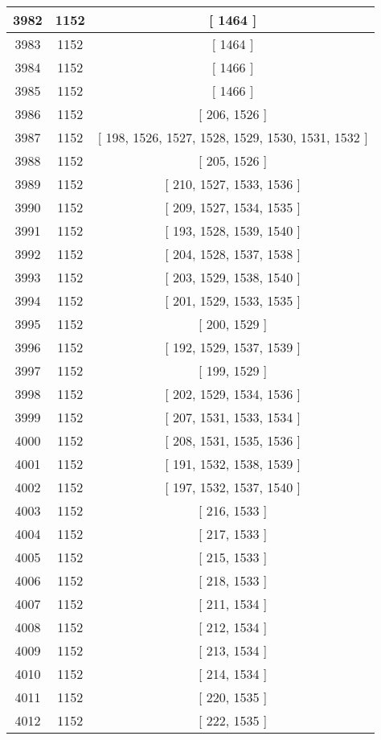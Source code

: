\begin{center}
\begin{longtable}[H]{|| c c c ||}
\hline
3982 & 1152 & [ 1464 ] \\ 
\hline
3983 & 1152 & [ 1464 ] \\ 
\hline
3984 & 1152 & [ 1466 ] \\ 
\hline
3985 & 1152 & [ 1466 ] \\ 
\hline
3986 & 1152 & [ 206, 1526 ] \\ 
\hline
3987 & 1152 & [ 198, 1526, 1527, 1528, 1529, 1530, 1531, 1532 ] \\ 
\hline
3988 & 1152 & [ 205, 1526 ] \\ 
\hline
3989 & 1152 & [ 210, 1527, 1533, 1536 ] \\ 
\hline
3990 & 1152 & [ 209, 1527, 1534, 1535 ] \\ 
\hline
3991 & 1152 & [ 193, 1528, 1539, 1540 ] \\ 
\hline
3992 & 1152 & [ 204, 1528, 1537, 1538 ] \\ 
\hline
3993 & 1152 & [ 203, 1529, 1538, 1540 ] \\ 
\hline
3994 & 1152 & [ 201, 1529, 1533, 1535 ] \\ 
\hline
3995 & 1152 & [ 200, 1529 ] \\ 
\hline
3996 & 1152 & [ 192, 1529, 1537, 1539 ] \\ 
\hline
3997 & 1152 & [ 199, 1529 ] \\ 
\hline
3998 & 1152 & [ 202, 1529, 1534, 1536 ] \\ 
\hline
3999 & 1152 & [ 207, 1531, 1533, 1534 ] \\ 
\hline
4000 & 1152 & [ 208, 1531, 1535, 1536 ] \\ 
\hline
4001 & 1152 & [ 191, 1532, 1538, 1539 ] \\ 
\hline
4002 & 1152 & [ 197, 1532, 1537, 1540 ] \\ 
\hline
4003 & 1152 & [ 216, 1533 ] \\ 
\hline
4004 & 1152 & [ 217, 1533 ] \\ 
\hline
4005 & 1152 & [ 215, 1533 ] \\ 
\hline
4006 & 1152 & [ 218, 1533 ] \\ 
\hline
4007 & 1152 & [ 211, 1534 ] \\ 
\hline
4008 & 1152 & [ 212, 1534 ] \\ 
\hline
4009 & 1152 & [ 213, 1534 ] \\ 
\hline
4010 & 1152 & [ 214, 1534 ] \\ 
\hline
4011 & 1152 & [ 220, 1535 ] \\ 
\hline
4012 & 1152 & [ 222, 1535 ] \\ 

\end{longtable}
\end{center}
